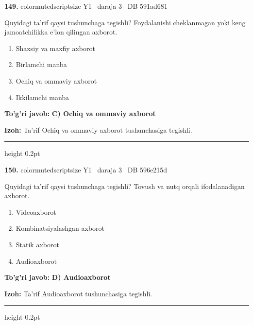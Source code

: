 \documentclass[10pt,a4paper,oneside]{article}
\begin{document}
\noindent\textbf{\color{ink}149.}  {color{muted}scriptsize Y1 \textbullet\ daraja 3 \textbullet\ DB 591ad681}
\par
Quyidagi ta'rif qaysi tushunchaga tegishli? Foydalanishi cheklanmagan yoki keng jamoatchilikka e'lon qilingan axborot.
\begin{enumerate}[label=\Alph*),leftmargin=9mm]
\item Shaxsiy va maxfiy axborot
\item Birlamchi manba
\item Ochiq va ommaviy axborot
\item Ikkilamchi manba
\end{enumerate}
\begin{tcolorbox}[enhanced,breakable,colback=teal!4,colframe=teal!50!black,boxrule=0.5pt,arc=1.1mm,left=3mm,right=3mm,top=1.7mm,bottom=1.7mm,before skip=2mm,after skip=2mm]
\textbf{\color{teal}To'g'ri javob:} \textbf{C) Ochiq va ommaviy axborot}
\par\smallskip
\textbf{Izoh:} Ta'rif Ochiq va ommaviy axborot tushunchasiga tegishli.
\end{tcolorbox}
\vspace{2mm}\hrule height 0.2pt \vspace{3mm}

\noindent\textbf{\color{ink}150.}  {color{muted}scriptsize Y1 \textbullet\ daraja 3 \textbullet\ DB 596e215d}
\par
Quyidagi ta'rif qaysi tushunchaga tegishli? Tovush va nutq orqali ifodalanadigan axborot.
\begin{enumerate}[label=\Alph*),leftmargin=9mm]
\item Videoaxborot
\item Kombinatsiyalashgan axborot
\item Statik axborot
\item Audioaxborot
\end{enumerate}
\begin{tcolorbox}[enhanced,breakable,colback=teal!4,colframe=teal!50!black,boxrule=0.5pt,arc=1.1mm,left=3mm,right=3mm,top=1.7mm,bottom=1.7mm,before skip=2mm,after skip=2mm]
\textbf{\color{teal}To'g'ri javob:} \textbf{D) Audioaxborot}
\par\smallskip
\textbf{Izoh:} Ta'rif Audioaxborot tushunchasiga tegishli.
\end{tcolorbox}
\vspace{2mm}\hrule height 0.2pt \vspace{3mm}
\end{document}
